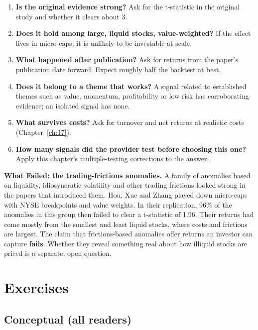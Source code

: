 \begin{enumerate}
  \item \textbf{Is the original evidence strong?} Ask for the t-statistic in the original study and whether it clears about 3.
  \item \textbf{Does it hold among large, liquid stocks, value-weighted?} If the effect lives in micro-caps, it is unlikely to be investable at scale.
  \item \textbf{What happened after publication?} Ask for returns from the paper's publication date forward. Expect roughly half the backtest at best.
  \item \textbf{Does it belong to a theme that works?} A signal related to established themes such as value, momentum, profitability or low risk has corroborating evidence; an isolated signal has none.
  \item \textbf{What survives costs?} Ask for turnover and net returns at realistic costs (Chapter~\ref{ch:17}).
  \item \textbf{How many signals did the provider test before choosing this one?} Apply this chapter's multiple-testing corrections to the answer.
\end{enumerate}

\begin{callout}
\textbf{What Failed: the trading-frictions anomalies.} A family of anomalies based on liquidity, idiosyncratic volatility and other trading frictions looked strong in the papers that introduced them. Hou, Xue and Zhang played down micro-caps with NYSE breakpoints and value weights. In their replication, 96\% of the anomalies in this group then failed to clear a t-statistic of 1.96. Their returns had come mostly from the smallest and least liquid stocks, where costs and frictions are largest. The claim that frictions-based anomalies offer returns an investor can capture \textbf{fails}. Whether they reveal something real about how illiquid stocks are priced is a separate, open question.
\end{callout}

\section*{Exercises}

\subsection*{Conceptual (all readers)}

